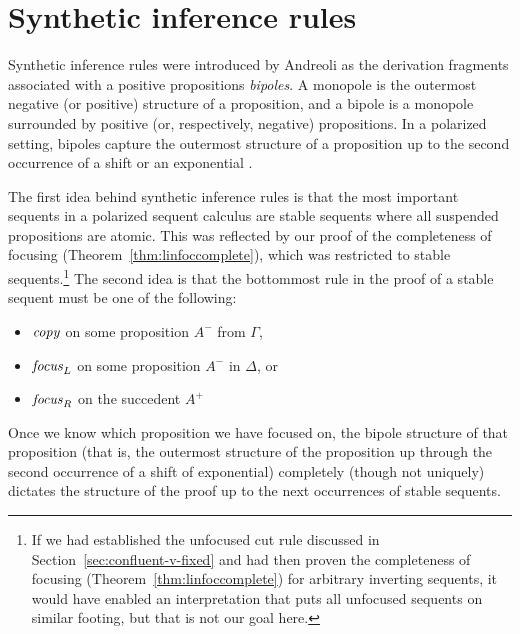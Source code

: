 \section{Synthetic inference rules}
\label{sec:linsynthetic}

Synthetic inference rules were introduced by Andreoli as the
derivation fragments associated with a positive propositions {\it
  bipoles}. A monopole is the outermost negative (or positive)
structure of a proposition, and a bipole is a monopole surrounded by
positive (or, respectively, negative) propositions. In a polarized
setting, bipoles capture the outermost structure of a proposition up
to the second occurrence of a shift or an exponential
\cite{andreoli01focussing}. 

The first idea behind synthetic inference rules is that the most
important sequents in a polarized sequent calculus are stable sequents
where all suspended propositions are atomic.  This was reflected by
our proof of the completeness of focusing
(Theorem~\ref{thm:linfoccomplete}), which was restricted to stable
sequents.\footnote{If we had established the unfocused cut rule
  discussed in Section~\ref{sec:confluent-v-fixed} and had then proven
  the completeness of focusing (Theorem~\ref{thm:linfoccomplete}) for
  arbitrary inverting sequents, it would have enabled an
  interpretation that puts all unfocused sequents on similar footing,
  but that is not our goal here.}
The second idea is that the bottommost rule in the proof of 
a stable sequent must be one of the following:
\smallskip
\begin{itemize}
\item ${\it copy}$ on some proposition $A^-$ from $\Gamma$, 
\item ${\it focus}_L$ on some proposition $A^-$ in $\Delta$, or
\item ${\it focus}_R$ on the succedent $A^+$
\end{itemize}
\smallskip
%
Once we know which proposition we have focused on, the bipole
structure of that proposition (that is, the outermost structure of the
proposition up through the second occurrence of a shift of exponential)
completely (though not uniquely) dictates the structure of the proof
up to the next occurrences of stable sequents.

